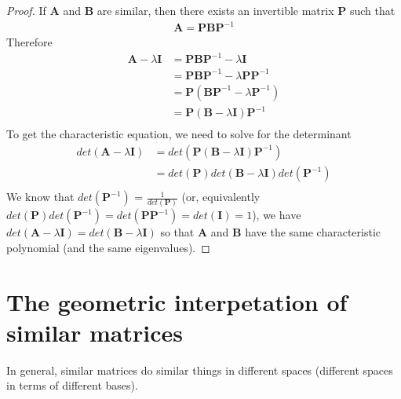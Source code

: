 \documentclass[
]{book}
\theoremstyle{definition}
\theoremstyle{definition}
\theoremstyle{definition}
\theoremstyle{definition}
\theoremstyle{remark}
\begin{document}
\begin{proof}
If \(\mathbf{A}\) and \(\mathbf{B}\) are similar, then there exists an invertible matrix \(\mathbf{P}\) such that
\[
\begin{aligned}
\mathbf{A} = \mathbf{P} \mathbf{B} \mathbf{P}^{-1}
\end{aligned}
\]
Therefore
\[
\begin{aligned}
\mathbf{A}  - \lambda \mathbf{I} & = \mathbf{P} \mathbf{B} \mathbf{P}^{-1} - \lambda \mathbf{I} \\
& = \mathbf{P} \mathbf{B} \mathbf{P}^{-1} - \lambda \mathbf{P} \mathbf{P}^{-1} \\
& =  \mathbf{P} \left( \mathbf{B} \mathbf{P}^{-1} - \lambda \mathbf{P}^{-1} \right) \\
& =  \mathbf{P} \left( \mathbf{B} - \lambda \mathbf{I} \right) \mathbf{P}^{-1}\\
\end{aligned}
\]
To get the characteristic equation, we need to solve for the determinant
\[
\begin{aligned}
det\left( \mathbf{A}  - \lambda \mathbf{I} \right) & = det\left( \mathbf{P} \left( \mathbf{B} - \lambda \mathbf{I} \right) \mathbf{P}^{-1} \right) \\
& = det\left( \mathbf{P} \right)  det\left( \mathbf{B} - \lambda \mathbf{I} \right) det\left(\mathbf{P}^{-1} \right) \\
\end{aligned}
\]
We know that \(det\left(\mathbf{P}^{-1} \right)\) = \(\frac{1}{det\left(\mathbf{P} \right)}\) (or, equivalently \(det\left(\mathbf{P} \right) det\left(\mathbf{P}^{-1} \right) = det\left(\mathbf{P} \mathbf{P}^{-1} \right) = det(\mathbf{I}) = 1\)), we have \(det\left( \mathbf{A} - \lambda \mathbf{I} \right) = det\left( \mathbf{B} - \lambda \mathbf{I} \right)\) so that \(\mathbf{A}\) and \(\mathbf{B}\) have the same characteristic polynomial (and the same eigenvalues).
\end{proof}

\hypertarget{the-geometric-interpetation-of-similar-matrices}{%
\section{The geometric interpetation of similar matrices}\label{the-geometric-interpetation-of-similar-matrices}}

In general, similar matrices do similar things in different spaces (different spaces in terms of different bases).
\end{document}
